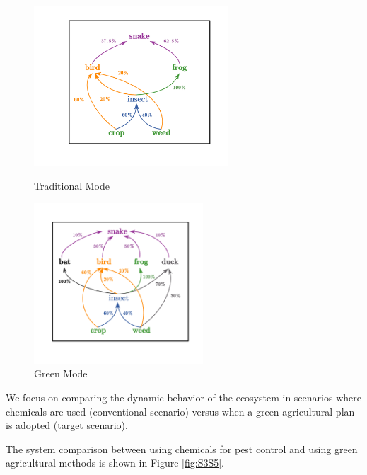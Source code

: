 \documentclass{HZNUMCM}
\begin{document}
        \begin{figure}[H]
          \begin{minipage}[b]{0.45\linewidth}
            \centering
            \includegraphics[height=6cm, keepaspectratio]{images/food_web_chem.pdf}
            \caption{Traditional Mode}
            \label{fig:food_web_chem}
          \end{minipage}
          \hspace{0.05\linewidth}
          \begin{minipage}[b]{0.45\linewidth}
              \centering
              \includegraphics[height=6cm, keepaspectratio]{images/food_web.pdf} %
              \caption{Green Mode}
              \label{fig:food_web_green}
          \end{minipage}
        \end{figure}
        
          We focus on comparing the dynamic behavior of the ecosystem in scenarios 
          where chemicals are used (conventional scenario) versus when a green agricultural plan is adopted (target scenario).

          The system comparison between using chemicals for pest control and using green agricultural methods is shown in Figure \ref{fig:S3S5}.
\end{document}
